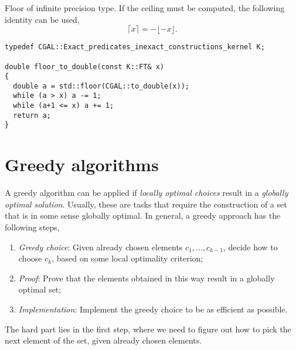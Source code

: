 \documentclass[justified,nobib]{tufte-handout}
\begin{document}
\begin{listing}
    \caption{Floor of infinite precision type. If the ceiling must be computed,
        the following identity can be used, \[ \lceil x \rceil = -\lfloor -x \rfloor .\]}
    \label{lst:floor}
    \begin{lstlisting}
typedef CGAL::Exact_predicates_inexact_constructions_kernel K;

double floor_to_double(const K::FT& x)
{
  double a = std::floor(CGAL::to_double(x));
  while (a > x) a -= 1;
  while (a+1 <= x) a += 1;
  return a;
}
  \end{lstlisting}
\end{listing}

\section{Greedy algorithms}


A greedy algorithm can be applied if \textit{locally optimal choices} result in a \textit{globally
    optimal solution}. Usually, these are tasks that require the construction of a set that is in some
sense globally optimal. In general, a greedy approach has the following steps,
\begin{enumerate}
    \item \textit{Greedy choice}: Given already chosen elements $c_1,\ldots,
              c_{k-1}$, decide how to choose $c_k$, based on some local optimality
          criterion;
    \item \textit{Proof}: Prove that the elements obtained in this way result in
          a globally optimal set;
    \item \textit{Implementation}: Implement the greedy choice to be as efficient
          as possible.
\end{enumerate}
The hard part lies in the first step, where we need to figure out how to pick
the next element of the set, given already chosen elements.
\end{document}
